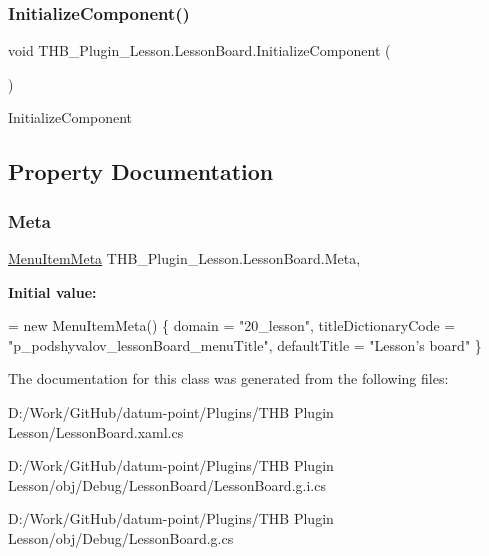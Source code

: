 \subsubsection{\texorpdfstring{Initialize\+Component()}{InitializeComponent()}\hspace{0.1cm}{\footnotesize\ttfamily [5/5]}}
{\footnotesize\ttfamily void T\+H\+B\+\_\+\+Plugin\+\_\+\+Lesson.\+Lesson\+Board.\+Initialize\+Component (\begin{DoxyParamCaption}{ }\end{DoxyParamCaption})}



Initialize\+Component 



\subsection{Property Documentation}
\mbox{\label{class_t_h_b___plugin___lesson_1_1_lesson_board_a8e0dbfdf59e44583f46bcd3728288e19}} 
\subsubsection{\texorpdfstring{Meta}{Meta}}
{\footnotesize\ttfamily \mbox{\hyperlink{class_uniform_client_1_1_plugins_1_1_menu_item_meta}{Menu\+Item\+Meta}} T\+H\+B\+\_\+\+Plugin\+\_\+\+Lesson.\+Lesson\+Board.\+Meta\hspace{0.3cm}{\ttfamily [get]}, {\ttfamily [set]}}

{\bfseries Initial value\+:}
\begin{DoxyCode}
= \textcolor{keyword}{new} MenuItemMeta()
        \{
            domain = \textcolor{stringliteral}{"20\_lesson"},
            titleDictionaryCode = \textcolor{stringliteral}{"p\_podshyvalov\_lessonBoard\_menuTitle"},
            defaultTitle = \textcolor{stringliteral}{"Lesson's board"}
        \}
\end{DoxyCode}


The documentation for this class was generated from the following files\+:\begin{DoxyCompactItemize}
\item 
D\+:/\+Work/\+Git\+Hub/datum-\/point/\+Plugins/\+T\+H\+B Plugin Lesson/Lesson\+Board.\+xaml.\+cs\item 
D\+:/\+Work/\+Git\+Hub/datum-\/point/\+Plugins/\+T\+H\+B Plugin Lesson/obj/\+Debug/\+Lesson\+Board/Lesson\+Board.\+g.\+i.\+cs\item 
D\+:/\+Work/\+Git\+Hub/datum-\/point/\+Plugins/\+T\+H\+B Plugin Lesson/obj/\+Debug/Lesson\+Board.\+g.\+cs\end{DoxyCompactItemize}
